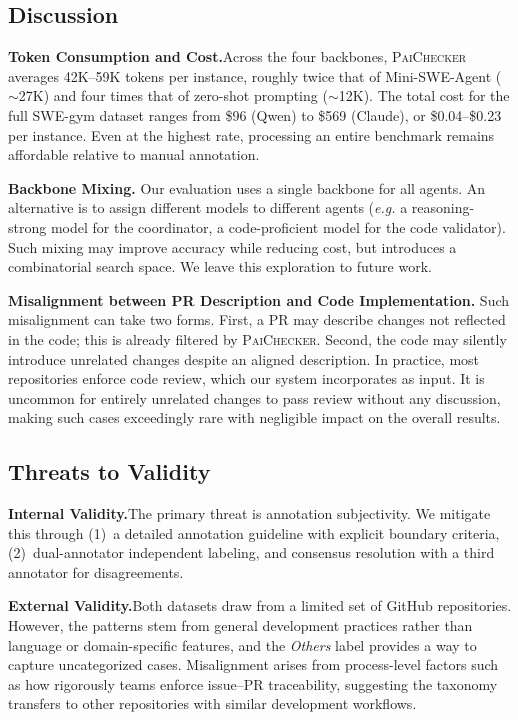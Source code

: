 \documentclass[sigconf, review, anonymous]{acmart}
\newcommand{\tool}{\textsc{PaiChecker}\xspace}
\newcommand{\eg}{\textit{e.g.}\xspace}
\begin{document}
    \subsection{Discussion}
    \label{sec:cost}

    \textbf{Token Consumption and Cost.}\quad Across the four backbones, \tool averages 42K--59K tokens per instance, roughly twice that of Mini-SWE-Agent (${\sim}$27K) and four times that of zero-shot prompting (${\sim}$12K). The total cost for the full SWE-gym dataset ranges from \$96 (Qwen) to \$569 (Claude), or \$0.04--\$0.23 per instance. Even at the highest rate, processing an entire benchmark remains affordable relative to manual annotation.

    \textbf{Backbone Mixing.}\quad
    Our evaluation uses a single backbone for all agents. An alternative is to assign different models to different agents (\eg a reasoning-strong model for the coordinator, a code-proficient model for the code validator). Such mixing may improve accuracy while reducing cost, but introduces a combinatorial search space. We leave this exploration to future work.

    \textbf{Misalignment between PR Description and Code Implementation.}\quad
    Such misalignment can take two forms. First, a PR may describe changes not reflected in the code; this 
  is already filtered by \tool. Second, the code may silently introduce unrelated changes
   despite an aligned description. In practice, most 
  repositories enforce code review, which our system incorporates as input. It is uncommon for entirely    
  unrelated changes to pass review without any discussion, making such cases exceedingly rare with 
  negligible impact on the overall results.  

    \subsection{Threats to Validity}
    \label{sec:threats}

    \textbf{Internal Validity.}\quad The primary threat is annotation subjectivity. We mitigate this through (1)~a detailed annotation guideline with explicit boundary criteria, (2)~dual-annotator independent labeling, and consensus resolution with a third annotator for disagreements. 

    \textbf{External Validity.}\quad Both datasets draw from a limited set of GitHub repositories. However, the patterns stem from general development practices rather than language or domain-specific features, and the \textit{Others }label provides a way to capture uncategorized cases. Misalignment arises from process-level factors such as how rigorously teams enforce issue–PR traceability, suggesting the taxonomy transfers to other repositories with similar development workflows.
\end{document}
